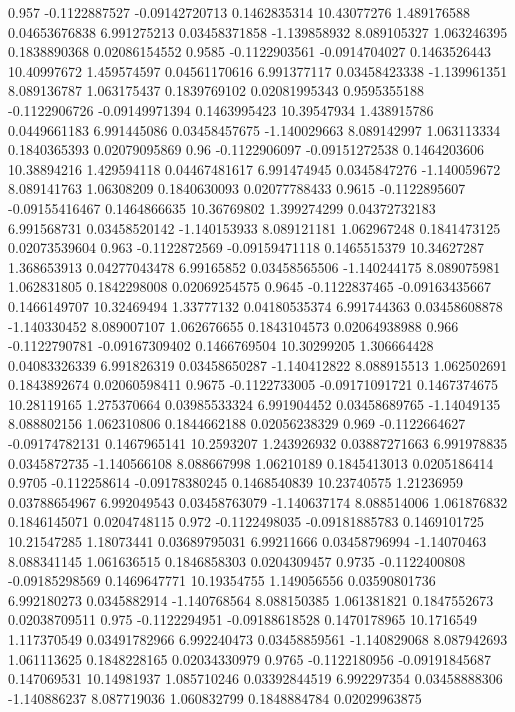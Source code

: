 {0.957 -0.1122887527 -0.09142720713 0.1462835314 10.43077276 1.489176588 0.04653676838 6.991275213 0.03458371858 -1.139858932 8.089105327 1.063246395 0.1838890368 0.02086154552
0.9585 -0.1122903561 -0.0914704027 0.1463526443 10.40997672 1.459574597 0.04561170616 6.991377117 0.03458423338 -1.139961351 8.089136787 1.063175437 0.1839769102 0.02081995343
0.9595355188 -0.1122906726 -0.09149971394 0.1463995423 10.39547934 1.438915786 0.0449661183 6.991445086 0.03458457675 -1.140029663 8.089142997 1.063113334 0.1840365393 0.02079095869
0.96 -0.1122906097 -0.09151272538 0.1464203606 10.38894216 1.429594118 0.04467481617 6.991474945 0.0345847276 -1.140059672 8.089141763 1.06308209 0.1840630093 0.02077788433
0.9615 -0.1122895607 -0.09155416467 0.1464866635 10.36769802 1.399274299 0.04372732183 6.991568731 0.03458520142 -1.140153933 8.089121181 1.062967248 0.1841473125 0.02073539604
0.963 -0.1122872569 -0.09159471118 0.1465515379 10.34627287 1.368653913 0.04277043478 6.99165852 0.03458565506 -1.140244175 8.089075981 1.062831805 0.1842298008 0.02069254575
0.9645 -0.1122837465 -0.09163435667 0.1466149707 10.32469494 1.33777132 0.04180535374 6.991744363 0.03458608878 -1.140330452 8.089007107 1.062676655 0.1843104573 0.02064938988
0.966 -0.1122790781 -0.09167309402 0.1466769504 10.30299205 1.306664428 0.04083326339 6.991826319 0.03458650287 -1.140412822 8.088915513 1.062502691 0.1843892674 0.02060598411
0.9675 -0.1122733005 -0.09171091721 0.1467374675 10.28119165 1.275370664 0.03985533324 6.991904452 0.03458689765 -1.14049135 8.088802156 1.062310806 0.1844662188 0.02056238329
0.969 -0.1122664627 -0.09174782131 0.1467965141 10.2593207 1.243926932 0.03887271663 6.991978835 0.0345872735 -1.140566108 8.088667998 1.06210189 0.1845413013 0.0205186414
0.9705 -0.112258614 -0.09178380245 0.1468540839 10.23740575 1.21236959 0.03788654967 6.992049543 0.03458763079 -1.140637174 8.088514006 1.061876832 0.1846145071 0.0204748115
0.972 -0.1122498035 -0.09181885783 0.1469101725 10.21547285 1.18073441 0.03689795031 6.99211666 0.03458796994 -1.14070463 8.088341145 1.061636515 0.1846858303 0.0204309457
0.9735 -0.1122400808 -0.09185298569 0.1469647771 10.19354755 1.149056556 0.03590801736 6.992180273 0.0345882914 -1.140768564 8.088150385 1.061381821 0.1847552673 0.02038709511
0.975 -0.1122294951 -0.09188618528 0.1470178965 10.1716549 1.117370549 0.03491782966 6.992240473 0.03458859561 -1.140829068 8.087942693 1.061113625 0.1848228165 0.02034330979
0.9765 -0.1122180956 -0.09191845687 0.147069531 10.14981937 1.085710246 0.03392844519 6.992297354 0.03458888306 -1.140886237 8.087719036 1.060832799 0.1848884784 0.02029963875
}
